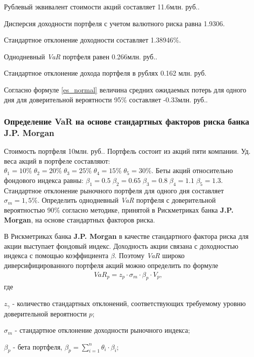 \documentclass[12pt, table, a4paper,twoside]{exam}
\begin{document}
\begin{questions}
\begin{solution}[12em]
\raggedright
Рублевый эквивалент стоимости акций составляет 11.6млн. руб..

Дисперсия доходности портфеля с учетом валютного риска равна 1.9306.

Стандартное отклонение доходности составляет 1.38946\%.

Однодневный \textit{VaR} портфеля равен 0.266млн. руб..

Стандартное отклонение дохода портфеля в рублях 0.162 млн. руб.

Согласно формуле \eqref{es_normal} величина средних ожидаемых потерь для одного дня для доверительной вероятности 95\% составляет -0.33млн. руб..
\end{solution}



\subsubsection{Определение VaR на основе стандартных факторов риска банка J.P. Morgan}
\question[10] Стоимость портфеля 10млн. руб.. Портфель состоит из акций пяти компании. Уд. веса акций в портфеле составляют: $\theta_1=10\%\; \theta_2=20\%\; \theta_3=25\%\; \theta_4=15\%\; \theta_5=30\%$. Беты акций относительно фондового индекса равны: $\beta_1 =0.5\; \beta_2 = 0.65\; \beta_3 =0.8\; \beta_4 = 1.1\; \beta_5 = 1.3$. Стандартное отклонение рыночного портфеля для одного дня составляет $\sigma_m=1,5\%$. Определить однодневный \textit{VaR }портфеля с доверительной вероятностью 90\% согласно методике, принятой в Рискметриках банка \textbf{J.P. Morgan}, на основе стандартных факторов риска.

\begin{solution}[12em]
	
	\raggedright
В Рискметриках банка \textbf{J.P. Morgan }в качестве стандартного фактора риска для акции выступает фондовый индекс. Доходность акции связана с доходностью индекса с помощью коэффициента $\beta$. Поэтому \textit{VaR }широко диверсифицированного портфеля акций можно определить по формуле
\begin{align}
\label{var_beta}
VaR_p=z_{p}\cdot \sigma_m\cdot  \beta_p\cdot  V_p,
\end{align}
где

$z_{\gamma}$ - количество стандартных отклонений, соответствующих требуемому уровню доверительной вероятности $p$;

$\sigma_m$ - стандартное отклонение доходности рыночного индекса;

$\beta_p$ - бета портфеля, $\beta_p=\sum_{i=1}^n\theta_i \cdot \beta_i$;


\end{solution}
\end{questions}
\end{document}
